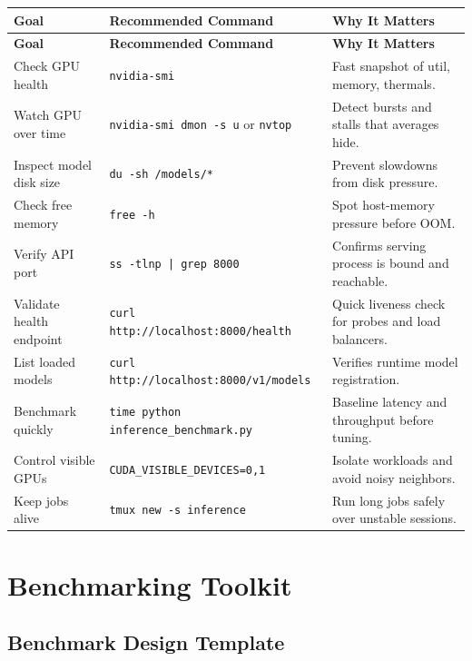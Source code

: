 \documentclass[10pt, oneside, openany]{book}
\newcommand{\code}[1]{\texttt{#1}}
\begin{document}
\begin{longtable}{@{}p{3.6cm}p{5.6cm}p{3.9cm}@{}}
  \toprule
  \textbf{Goal} & \textbf{Recommended Command} & \textbf{Why It Matters} \\
  \midrule
  \endfirsthead
  \toprule
  \textbf{Goal} & \textbf{Recommended Command} & \textbf{Why It Matters} \\
  \midrule
  \endhead
  Check GPU health & \code{nvidia-smi} & Fast snapshot of util, memory, thermals. \\
  Watch GPU over time & \code{nvidia-smi dmon -s u} or \code{nvtop} & Detect bursts and stalls that averages hide. \\
  Inspect model disk size & \code{du -sh /models/*} & Prevent slowdowns from disk pressure. \\
  Check free memory & \code{free -h} & Spot host-memory pressure before OOM. \\
  Verify API port & \code{ss -tlnp | grep 8000} & Confirms serving process is bound and reachable. \\
  Validate health endpoint & \code{curl http://localhost:8000/health} & Quick liveness check for probes and load balancers. \\
  List loaded models & \code{curl http://localhost:8000/v1/models} & Verifies runtime model registration. \\
  Benchmark quickly & \code{time python inference\_benchmark.py} & Baseline latency and throughput before tuning. \\
  Control visible GPUs & \code{CUDA\_VISIBLE\_DEVICES=0,1} & Isolate workloads and avoid noisy neighbors. \\
  Keep jobs alive & \code{tmux new -s inference} & Run long jobs safely over unstable sessions. \\
  \bottomrule
\end{longtable}

\chapter{Benchmarking Toolkit}
\label{app:benchmark}

\section*{Benchmark Design Template}
\end{document}
